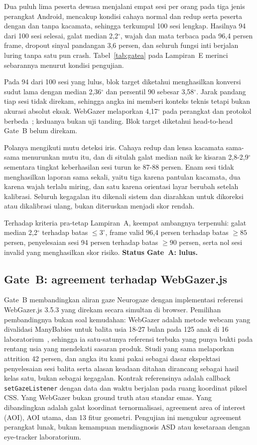 \documentclass{article}
\begin{document}
Dua puluh lima peserta dewasa menjalani empat sesi per orang pada tiga jenis perangkat
Android, mencakup kondisi cahaya normal dan redup serta peserta dengan dan tanpa kacamata,
sehingga terkumpul 100 sesi lengkap. Hasilnya 94 dari 100 sesi selesai, galat median
2,2$^\circ$, wajah dan mata terbaca pada 96,4 persen frame, dropout sinyal pandangan 3,6
persen, dan seluruh fungsi inti berjalan luring tanpa satu pun crash. Tabel~\ref{tab:gatea} pada Lampiran~E
merinci sebarannya menurut kondisi pengujian.

Pada 94 dari 100 sesi yang lulus, blok target diketahui menghasilkan konversi sudut lama
dengan median 2,36$^\circ$ dan persentil 90 sebesar 3,58$^\circ$. Jarak pandang tiap sesi
tidak direkam, sehingga angka ini memberi konteks teknis tetapi bukan akurasi absolut eksak.
WebGazer melaporkan 4,17$^\circ$ pada perangkat dan protokol berbeda~\cite{papoutsaki2016};
keduanya bukan uji tanding. Blok target diketahui head-to-head Gate~B belum direkam.

Polanya mengikuti mutu deteksi iris. Cahaya redup dan lensa kacamata sama-sama menurunkan
mutu itu, dan di situlah galat median naik ke kisaran 2,8-2,9$^\circ$ sementara tingkat
keberhasilan sesi turun ke 87-88 persen. Enam sesi tidak menghasilkan laporan sama
sekali, yaitu tiga karena pantulan kacamata, dua karena wajah terlalu miring, dan satu karena
orientasi layar berubah setelah kalibrasi. Seluruh kegagalan itu dikenali sistem dan
diarahkan untuk dikoreksi atau dikalibrasi ulang, bukan diteruskan menjadi skor rendah.

Terhadap kriteria pra-tetap Lampiran~A, keempat ambangnya terpenuhi: galat median
2,2$^\circ$ terhadap batas $\leq 3^\circ$, frame valid 96,4 persen terhadap batas $\geq 85$
persen, penyelesaian sesi 94 persen terhadap batas $\geq 90$ persen, serta nol sesi invalid
yang menghasilkan skor risiko. \textbf{Status Gate~A: lulus.}

\subsection{Gate~B: agreement terhadap WebGazer.js}
\label{sec:gateb}

Gate~B membandingkan aliran gaze Neurogaze dengan implementasi referensi WebGazer.js 3.5.3 yang direkam secara
simultan di browser. Pemilihan pembandingnya bukan soal kemudahan: WebGazer adalah metode
webcam yang divalidasi ManyBabies untuk balita usia 18-27 bulan pada 125 anak di 16
laboratorium~\cite{steffan2024}, sehingga ia satu-satunya referensi terbuka yang punya bukti
pada rentang usia yang mendekati sasaran produk. Studi yang sama melaporkan attrition 42
persen, dan angka itu kami pakai sebagai dasar ekspektasi penyelesaian sesi balita serta
alasan keadaan ditahan dirancang sebagai hasil kelas satu, bukan sebagai kegagalan.
Kontrak referensinya adalah callback
\texttt{setGazeListener} dengan data dan waktu berjalan pada ruang koordinat piksel CSS. Yang
WebGazer bukan ground truth atau standar emas. Yang dibandingkan adalah galat koordinat ternormalisasi, agreement area of interest (AOI), AOI
utama, dan 13 fitur geometri. Pengujian ini mengukur agreement perangkat lunak, bukan
kemampuan mendiagnosis ASD atau kesetaraan dengan eye-tracker laboratorium.
\end{document}
